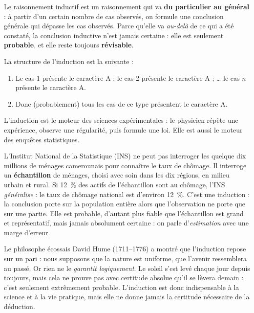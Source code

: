 \documentclass[11pt]{article}
\newcommand{\cle}[1]{{\popxbold\color{popdark}#1}}
\begin{document}
\begin{definition}[L'induction]
Le raisonnement \cle{inductif} est un raisonnement qui va \textbf{du particulier au général} : à partir d'un certain nombre de cas observés, on formule une conclusion générale qui dépasse les cas observés. Parce qu'elle va \emph{au-delà} de ce qui a été constaté, la conclusion inductive n'est jamais certaine : elle est seulement \textbf{probable}, et elle reste toujours \textbf{révisable}.
\end{definition}

La structure de l'induction est la suivante :
\begin{enumerate}
\item Le cas 1 présente le caractère A ; le cas 2 présente le caractère A ; \ldots{} le cas $n$ présente le caractère A.
\item Donc (probablement) tous les cas de ce type présentent le caractère A.
\end{enumerate}

L'induction est le moteur des sciences expérimentales : le physicien répète une expérience, observe une régularité, puis formule une loi. Elle est aussi le moteur des enquêtes statistiques.

\begin{exemplebox}
L'Institut National de la Statistique (INS) ne peut pas interroger les quelque dix millions de ménages camerounais pour connaître le taux de chômage. Il interroge un \textbf{échantillon} de ménages, choisi avec soin dans les dix régions, en milieu urbain et rural. Si 12~\% des actifs de l'échantillon sont au chômage, l'INS \emph{généralise} : le taux de chômage national est d'environ 12~\%. C'est une induction : la conclusion porte sur la population entière alors que l'observation ne porte que sur une partie. Elle est probable, d'autant plus fiable que l'échantillon est grand et représentatif, mais jamais absolument certaine : on parle d'\emph{estimation} avec une marge d'erreur.
\end{exemplebox}

\begin{savaistu}
Le philosophe écossais David Hume (1711--1776) a montré que l'induction repose sur un pari : nous supposons que la nature est uniforme, que l'avenir ressemblera au passé. Or rien ne le \emph{garantit logiquement}. Le soleil s'est levé chaque jour depuis toujours, mais cela ne prouve pas avec certitude absolue qu'il se lèvera demain : c'est seulement extrêmement probable. L'induction est donc indispensable à la science et à la vie pratique, mais elle ne donne jamais la certitude nécessaire de la déduction.
\end{savaistu}
\end{document}
